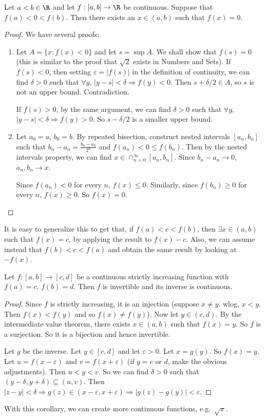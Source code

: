 \documentclass[a4paper]{article}
\begin{document}
\begin{thm}
  Let $a < b\in \R$ and let $f: [a, b] \to \R$ be continuous. Suppose that $f(a) < 0 < f(b)$. Then there exists an $x\in (a, b)$ such that $f(x) = 0$.
\end{thm}

\begin{proof}
  We have several proofs:
  \begin{enumerate}
    \item Let $A = \{x: f(x) < 0\}$ and let $s = \sup A$. We shall show that $f(s) = 0$ (this is similar to the proof that $\sqrt{2}$ exists in Numbers and Sets). If $f(s) < 0$, then setting $\varepsilon = |f(s)|$ in the definition of continuity, we can find $\delta > 0$ such that $\forall y$, $|y - s| < \delta \Rightarrow f(y) < 0$. Then $s + \delta/2 \in A$, so $s$ is not an upper bound. Contradiction.

    If $f(s) > 0$, by the same argument, we can find $\delta > 0$ such that $\forall y$, $|y - s| < \delta \Rightarrow f(y) > 0$. So $s - \delta/2$ is a smaller upper bound.
  \item Let $a_0 = a$, $b_0 = b$. By repeated bisection, construct nested intervals $[a_n, b_n]$ such that $b_n - a_n = \frac{b_0 - a_0}{2^n}$ and $f(a_n) < 0 \leq f(b_n)$. Then by the nested intervals property, we can find $x\in \cap_{n = 0}^\infty [a_n, b_n]$. Since $b_n - a_n \to 0$, $a_n, b_n \to x$.

    Since $f(a_n) < 0$ for every $n$, $f(x) \leq 0$. Similarly, since $f(b_n) \geq 0$ for every $n$, $f(x) \geq 0$. So $f(x) = 0$.
  \end{enumerate}
\end{proof}
It is easy to generalize this to get that, if $f(a) < c < f(b)$, then $\exists x\in (a, b)$ such that $f(x) = c$, by applying the result to $f(x) - c$. Also, we can assume instead that $f(b) < c < f(a)$ and obtain the same result by looking at $-f(x)$.

\begin{cor}
  Let $f: [a, b]\to [c, d]$ be a continuous strictly increasing function with $f(a) = c$, $f(b) = d$. Then $f$ is invertible and its inverse is continuous.
\end{cor}

\begin{proof}
  Since $f$ is strictly increasing, it is an injection (suppose $x \not= y$. wlog, $x < y$. Then $f(x) < f(y)$ and so $f(x) \not= f(y)$). Now let $y\in (c, d)$. By the intermediate value theorem, there exists $x\in (a, b)$ such that $f(x) = y$. So $f$ is a surjection. So it is a bijection and hence invertible.

  Let $g$ be the inverse. Let $y\in [c, d]$ and let $\varepsilon > 0$. Let $x = g(y)$. So $f(x) = y$. Let $u = f(x - \varepsilon)$ and $v = f(x + \varepsilon)$ (if $y = c$ or $d$, make the obvious adjustments). Then $u < y < v$. So we can find $\delta > 0$ such that $(y - \delta , y + \delta) \subseteq (u, v)$. Then $|z - y| < \delta \Rightarrow g(z) \in (x - \varepsilon, x + \varepsilon) \Rightarrow |g(z) - g(y)| < \varepsilon$.
\end{proof}
With this corollary, we can create more continuous functions, e.g.\ $\sqrt{x}$.
\end{document}

